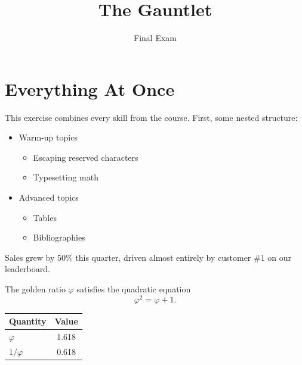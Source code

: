 \documentclass{article}
\title{The Gauntlet}
\author{Final Exam}
\date{}
\begin{document}
\maketitle

\section{Everything At Once}

This exercise combines every skill from the course. First, some nested
structure:

\begin{itemize}
\item Warm-up topics
  \begin{itemize}
  \item Escaping reserved characters
  \item Typesetting math
  \end{itemize}
\item Advanced topics
  \begin{itemize}
  \item Tables
  \item Bibliographies
  \end{itemize}
\end{itemize}

Sales grew by 50\% this quarter, driven almost entirely by customer
\#1 on our leaderboard.

The golden ratio $\varphi$ satisfies the quadratic equation
\[
\varphi^2 = \varphi + 1.
\]

\begin{center}
\begin{tabular}{lc}
\toprule
Quantity & Value \\
\midrule
$\varphi$ & 1.618 \\
$1/\varphi$ & 0.618 \\
\bottomrule
\end{tabular}
\end{center}
\end{document}
